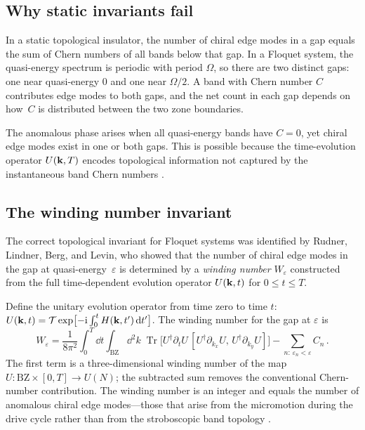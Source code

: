 \subsection{Why static invariants fail}
\label{sec:ch13-anomalous-why}

In a static topological insulator, the number of chiral edge modes in
a gap equals the sum of Chern numbers of all bands below that gap.
In a Floquet system, the quasi-energy spectrum is periodic with period
$\Omega$, so there are two distinct gaps: one near quasi-energy $0$
and one near $\Omega/2$.  A band with Chern number $C$ contributes
edge modes to both gaps, and the net count in each gap depends on
how~$C$ is distributed between the two zone boundaries.

The anomalous phase arises when all quasi-energy bands have $C=0$, yet
chiral edge modes exist in one or both gaps.  This is possible because
the time-evolution operator $U(\mathbf{k},T)$ encodes topological
information not captured by the instantaneous band Chern numbers
\cite{nathan2015topological,kitagawa2010topological}.

\subsection{The winding number invariant}
\label{sec:ch13-winding-invariant}

The correct topological invariant for Floquet systems was identified
by Rudner, Lindner, Berg, and Levin, who showed that the number of
chiral edge modes in the gap at quasi-energy~$\varepsilon$ is
determined by a \emph{winding number} $W_\varepsilon$ constructed from
the full time-dependent evolution operator $U(\mathbf{k},t)$ for
$0\le t\le T$.

Define the unitary evolution operator from time zero to time $t$:
$U(\mathbf{k},t)=\mathcal{T}\exp\bigl[-\mathrm{i}\int_0^t
H(\mathbf{k},t')\,\mathrm{d} t'\bigr]$.  The winding number for the gap at
$\varepsilon$ is
\begin{equation}\label{eq:ch13-rudner-winding}
  W_\varepsilon
  = \frac{1}{8\pi^2}\int_0^T\!\dd t\int_{\mathrm{BZ}}\!\dd^2k\;
  \operatorname{Tr}\bigl[
  U^\dagger\partial_t U\,
  [U^\dagger\partial_{k_x}U,\,U^\dagger\partial_{k_y}U]
  \bigr]
  - \sum_{n:\,\varepsilon_n<\varepsilon} C_n\,.
\end{equation}
The first term is a three-dimensional winding number of the map
$U:\mathrm{BZ}\times[0,T]\to U(N)$; the subtracted sum removes the
conventional Chern-number contribution.  The winding number is an
integer and equals the number of anomalous chiral edge modes---those
that arise from the micromotion during the drive cycle rather than
from the stroboscopic band topology
\cite{nathan2015topological,ozawa2018topological}.

